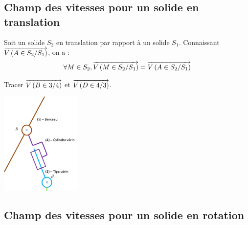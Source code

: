 \documentclass[11pt,oneside]{article}
\begin{document}
\subsection{Champ des vitesses pour un solide en translation}
\begin{resultat}
Soit un solide $S_2$ en translation par rapport à un solide $S_1$. Connaissant $\overrightarrow{V\left( {A} \in {S_2}/{S_1}\right)}$, on a :
$$
\forall M \in S_2, \overrightarrow{V\left( {M} \in {S_2}/{S_1}\right)} = \overrightarrow{V\left( {A} \in {S_2}/{S_1}\right)}
$$
\end{resultat}
\begin{exemple}

Tracer $\overrightarrow{V\left( {B} \in {3}/{4}\right)}$ et $\overrightarrow{V\left( {D} \in {4}/{3}\right)}$.

\begin{center}
\includegraphics[width=4cm]{png/verin}
\end{center}

\end{exemple}

\subsection{Champ des vitesses pour un solide en rotation}
\end{document}
